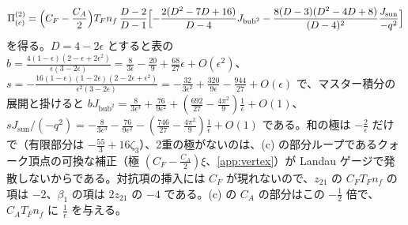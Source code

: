 \documentclass[a4paper,10pt]{ltjsarticle}
\begin{document}
\begin{equation*}
\Pi^{(2)}_{(c)}=\Bigl(C_F-\frac{C_A}2\Bigr)T_Fn_f\,\frac{D-2}{D-1}\Bigl[-\frac{2(D^2-7D+16)}{D-4}J_{\mathrm{bub}^2}-\frac{8(D-3)(D^2-4D+8)}{(D-4)^2}\frac{J_{\mathrm{sun}}}{-q^2}\Bigr]
\end{equation*}
を得る。$D=4-2\epsilon$ とすると表の $b=\frac{4(1-\epsilon)(2-\epsilon+2\epsilon^2)}{\epsilon(3-2\epsilon)}=\frac8{3\epsilon}-\frac{20}9+\frac{68}{27}\epsilon+O(\epsilon^2)$、$s=-\frac{16(1-\epsilon)(1-2\epsilon)(2-2\epsilon+\epsilon^2)}{\epsilon^2(3-2\epsilon)}=-\frac{32}{3\epsilon^2}+\frac{320}{9\epsilon}-\frac{944}{27}+O(\epsilon)$ で、マスター積分の展開と掛けると $bJ_{\mathrm{bub}^2}=\frac8{3\epsilon^3}+\frac{76}{9\epsilon^2}+(\frac{692}{27}-\frac{4\pi^2}9)\frac1\epsilon+O(1)$、$sJ_{\mathrm{sun}}/(-q^2)=-\frac8{3\epsilon^3}-\frac{76}{9\epsilon^2}-(\frac{746}{27}-\frac{4\pi^2}9)\frac1\epsilon+O(1)$ である。和の極は $-\frac2\epsilon$ だけで（有限部分は $-\frac{55}3+16\zeta_3$）、2重の極がないのは、(c) の部分ループであるクォーク頂点の可換な補正（極 $(C_F-\frac{C_A}2)\xi$、\ref{app:vertex}）が Landau ゲージで発散しないからである。対抗項の挿入には $C_F$ が現れないので、$z_{21}$ の $C_FT_Fn_f$ の項は $-2$、$\beta_1$ の項は $2z_{21}$ の $-4$ である。(c) の $C_A$ の部分はこの $-\frac12$ 倍で、$C_AT_Fn_f$ に $\frac1\epsilon$ を与える。
\end{document}
